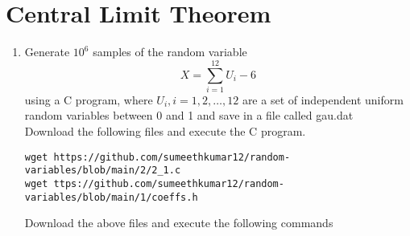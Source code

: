 \documentclass[journal,12pt,twocolumn]{IEEEtran}
\begin{document}
\section{Central Limit Theorem}
%
\begin{enumerate}[label=\thesection.\arabic*
,ref=\thesection.\theenumi]
%
\item
Generate $10^6$ samples of the random variable
%
\begin{equation}
X = \sum_{i=1}^{12}U_i -6
\end{equation}
%
using a C program, where $U_i, i = 1,2,\dots, 12$ are  a set of independent uniform random variables between 0 and 1 and save in a file called gau.dat\\
\solution Download the following files and execute the  C program.
\begin{lstlisting}
wget https://github.com/sumeethkumar12/random-variables/blob/main/2/2_1.c
wget ttps://github.com/sumeethkumar12/random-variables/blob/main/1/coeffs.h
\end{lstlisting}
Download the above files and execute the following commands


\end{enumerate}
\end{document}
